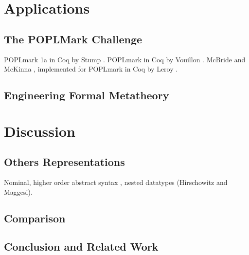 \documentclass[a4paper,11pt]{article}
\begin{document}
\section{Applications}

\subsection{The POPLMark Challenge}

POPLmark 1a in Coq by Stump \cite{Stump-05}.
POPLmark in Coq by Vouillon \cite{Vouillon-05}.
McBride and McKinna \cite{McBride-McKinna-04}, implemented for POPLmark in Coq by Leroy \cite{Leroy-07}.

\subsection{Engineering Formal Metatheory}


\section{Discussion}\label{sec:discussion}

\subsection{Others Representations}

Nominal, higher order abstract syntax \cite{Capretta-Felty-06}, nested datatypes (Hirschowitz and Maggesi).

\subsection{Comparison}

\subsection{Conclusion and Related Work}


\nocite{*}


\end{document}

